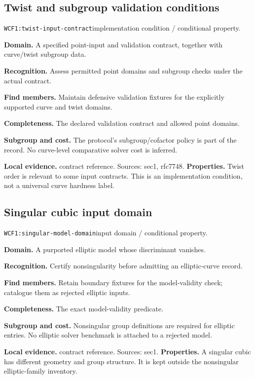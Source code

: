 \documentclass[10pt]{article}
\begin{document}
\subsection{Twist and subgroup validation conditions}
\texttt{WCF1:twist-input-contract}\quad implementation condition / conditional property.\par
\textbf{Domain.} A specified point-input and validation contract, together with curve/twist subgroup data.\par
\textbf{Recognition.} Assess permitted point domains and subgroup checks under the actual contract.\par
\textbf{Find members.} Maintain defensive validation fixtures for the explicitly supported curve and twist domains.\par
\textbf{Completeness.} The declared validation contract and allowed point domains.\par
\textbf{Subgroup and cost.} The protocol's subgroup/cofactor policy is part of the record. No curve-level comparative solver cost is inferred.\par
\textbf{Local evidence.} contract reference. Sources: sec1, rfc7748.
\textbf{Properties.} Twist order is relevant to some input contracts. This is an implementation condition, not a universal curve hardness label.\par
{}\subsection{Singular cubic input domain}
\texttt{WCF1:singular-model-domain}\quad input domain / conditional property.\par
\textbf{Domain.} A purported elliptic model whose discriminant vanishes.\par
\textbf{Recognition.} Certify nonsingularity before admitting an elliptic-curve record.\par
\textbf{Find members.} Retain boundary fixtures for the model-validity check; catalogue them as rejected elliptic inputs.\par
\textbf{Completeness.} The exact model-validity predicate.\par
\textbf{Subgroup and cost.} Nonsingular group definitions are required for elliptic entries. No elliptic solver benchmark is attached to a rejected model.\par
\textbf{Local evidence.} contract reference. Sources: sec1.
\textbf{Properties.} A singular cubic has different geometry and group structure. It is kept outside the nonsingular elliptic-family inventory.\par
\end{document}
